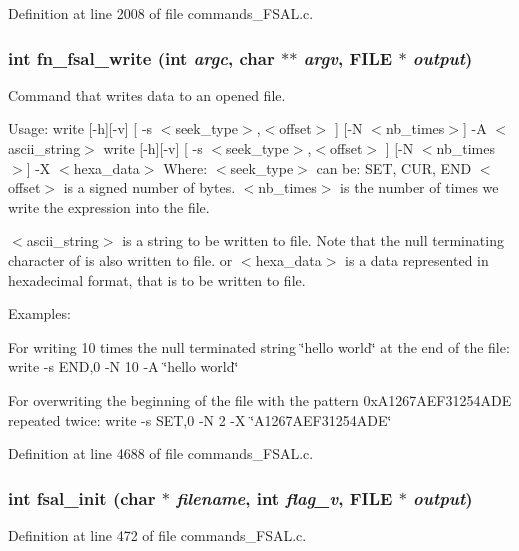 Definition at line 2008 of file commands\_\-FSAL.c.
\subsubsection[{fn\_\-fsal\_\-write}]{\setlength{\rightskip}{0pt plus 5cm}int fn\_\-fsal\_\-write (int {\em argc}, \/  char $\ast$$\ast$ {\em argv}, \/  FILE $\ast$ {\em output})}\label{commands__FSAL_8c_a4874930678cbb1e7a19e0bab498f5a4c}
Command that writes data to an opened file.

Usage: write [-\/h][-\/v] [ -\/s $<$seek\_\-type$>$,$<$offset$>$ ] [-\/N $<$nb\_\-times$>$] -\/A $<$ascii\_\-string$>$ write [-\/h][-\/v] [ -\/s $<$seek\_\-type$>$,$<$offset$>$ ] [-\/N $<$nb\_\-times$>$] -\/X $<$hexa\_\-data$>$ Where: $<$seek\_\-type$>$ can be: SET, CUR, END $<$offset$>$ is a signed number of bytes. $<$nb\_\-times$>$ is the number of times we write the expression into the file.

$<$ascii\_\-string$>$ is a string to be written to file. Note that the null terminating character of is also written to file. or $<$hexa\_\-data$>$ is a data represented in hexadecimal format, that is to be written to file.

Examples:

For writing 10 times the null terminated string \char`\"{}hello world\char`\"{} at the end of the file: write -\/s END,0 -\/N 10 -\/A \char`\"{}hello world\char`\"{}

For overwriting the beginning of the file with the pattern 0xA1267AEF31254ADE repeated twice: write -\/s SET,0 -\/N 2 -\/X \char`\"{}A1267AEF31254ADE\char`\"{} 

Definition at line 4688 of file commands\_\-FSAL.c.
\subsubsection[{fsal\_\-init}]{\setlength{\rightskip}{0pt plus 5cm}int fsal\_\-init (char $\ast$ {\em filename}, \/  int {\em flag\_\-v}, \/  FILE $\ast$ {\em output})}\label{commands__FSAL_8c_aedffedae46ff950a16883425cefd370d}


Definition at line 472 of file commands\_\-FSAL.c.
